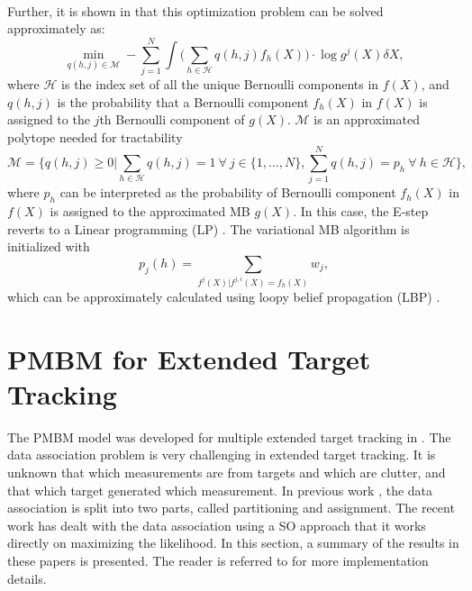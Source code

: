 ~\\
Further, it is shown in \cite{variational} that this optimization problem can be solved approximately as:
\begin{equation}
    \min\limits_{q(h,j)\in\mathcal{M}}-\sum^N_{j=1}\int \Bigg(\sum_{h\in\mathcal{H}}q(h,j)f_{h}(X)\Bigg)\cdot\log g^j(X)\delta X,
    \label{eq:qhj}
\end{equation}
where $\mathcal{H}$ is the index set of all the unique Bernoulli components in $f(X)$, and $q(h,j)$ is the probability that a Bernoulli component $f_h(X)$ in $f(X)$ is assigned to the $j$th Bernoulli component of $g(X)$. $\mathcal{M}$ is an approximated polytope needed for tractability
\begin{equation}
    \mathcal{M} = \Bigg\{q(h,j)\geq0\Bigg|\sum_{h\in\mathcal{H}}q(h,j)=1 ~\forall~ j\in\{1,...,N\},\sum^N_{j=1}q(h,j)=p_h ~\forall~ h\in\mathcal{H}\Bigg\},
\end{equation}
where $p_h$ can be interpreted as the probability of Bernoulli component $f_h(X)$ in $f(X)$ is assigned to the approximated MB $g(X)$. In this case, the E-step reverts to a Linear programming (LP) \cite{variational}. The variational MB algorithm is initialized with
\begin{equation}
p_j(h) = \sum\limits_{f^j(X)|f^{j,i}(X)=f_h(X)}w_j,
\end{equation}
which can be approximately calculated using loopy belief propagation (LBP) \cite{lbp}.

\section{PMBM for Extended Target Tracking}
The PMBM model was developed for multiple extended target tracking in \cite{pmbmextended,pmbmextended2,soextended}. The data association problem is very challenging in extended target tracking. It is unknown that which measurements are from targets and which are clutter, and that which target generated which measurement. In previous work \cite{pmbmextended,pmbmextended2}, the data association is split into two parts, called partitioning and assignment. The recent work \cite{soextended} has dealt with the data association using a SO approach that it works directly on maximizing the likelihood. In this section, a summary of the results in these papers is presented. The reader is referred to \cite{pmbmextended,pmbmextended2,soextended} for more implementation details.  

